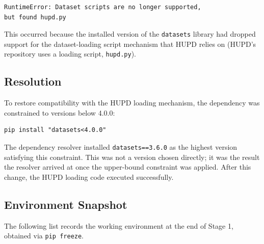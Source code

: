 \documentclass[11pt]{article}
\begin{document}
\begin{lstlisting}
RuntimeError: Dataset scripts are no longer supported,
but found hupd.py
\end{lstlisting}

This occurred because the installed version of the \texttt{datasets} library had dropped support for the dataset-loading script mechanism that HUPD relies on (HUPD's repository uses a loading script, \texttt{hupd.py}).

\subsection{Resolution}

To restore compatibility with the HUPD loading mechanism, the dependency was constrained to versions below 4.0.0:

\begin{lstlisting}
pip install "datasets<4.0.0"
\end{lstlisting}

The dependency resolver installed \texttt{datasets==3.6.0} as the highest version satisfying this constraint. This was not a version chosen directly; it was the result the resolver arrived at once the upper-bound constraint was applied. After this change, the HUPD loading code executed successfully.

\subsection{Environment Snapshot}

The following list records the working environment at the end of Stage 1, obtained via \texttt{pip freeze}.
\end{document}
